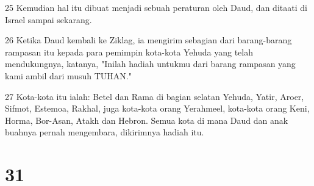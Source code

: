 \par 25 Kemudian hal itu dibuat menjadi sebuah peraturan oleh Daud, dan ditaati di Israel sampai sekarang.
\par 26 Ketika Daud kembali ke Ziklag, ia mengirim sebagian dari barang-barang rampasan itu kepada para pemimpin kota-kota Yehuda yang telah mendukungnya, katanya, "Inilah hadiah untukmu dari barang rampasan yang kami ambil dari musuh TUHAN."
\par 27 Kota-kota itu ialah: Betel dan Rama di bagian selatan Yehuda, Yatir, Aroer, Sifmot, Estemoa, Rakhal, juga kota-kota orang Yerahmeel, kota-kota orang Keni, Horma, Bor-Asan, Atakh dan Hebron. Semua kota di mana Daud dan anak buahnya pernah mengembara, dikirimnya hadiah itu.

\chapter{31}

